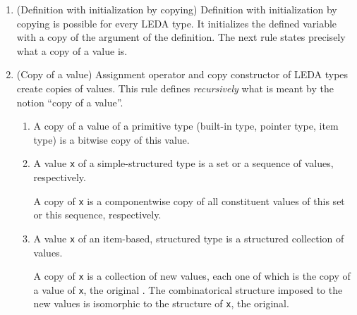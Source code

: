     \begin{enumerate}
 

      \item 

	

 (Definition with initialization by copying) Definition
	with initialization by copying is possible for every LEDA
	type. It initializes the defined variable with a copy of the
	argument of the definition. The next rule states precisely
	what a copy of a value is.
      


      \item 


          

 (Copy of a value) Assignment operator and copy
          constructor of LEDA types create copies of values. This rule
          defines \emph{recursively} what is meant by
          the notion ``copy of a value''.
 
\begin{enumerate}
 





	  \item 
              

 A copy of a value of a primitive type (built-in
              type, pointer type, item type) is a bitwise copy of this
              value.
	  


	  \item 
              

 A value \verb$x$ of a
              simple-structured type is a set or a sequence of values,
              respectively.

              

 A copy of \verb$x$ is a componentwise
              copy of all constituent values of this set or this
              sequence, respectively.
	  


      \item 
              

 A value \verb$x$ of an item-based,
              structured type is a structured collection of
              values.

              

 A copy of \verb$x$ is a collection of
              new values, each one of which is the copy of a value of
              \verb$x$, the original . The
              combinatorical structure imposed to the new values is
              isomorphic to the structure of \verb$x$, the
              original.


\end{enumerate}
\end{enumerate}

